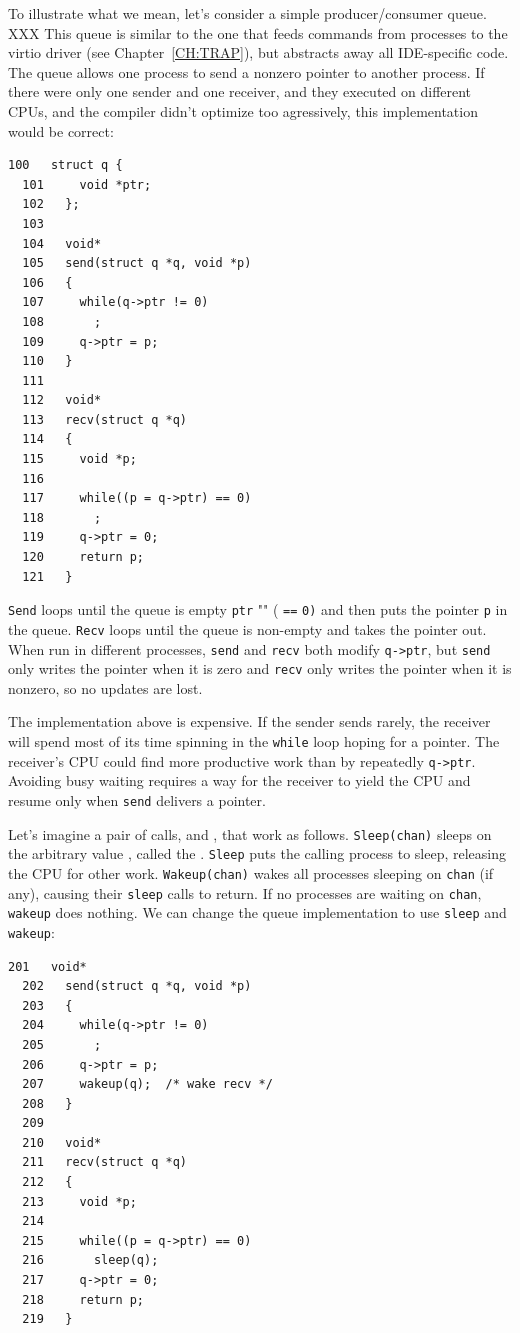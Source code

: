 To illustrate what we mean, let's consider a
simple producer/consumer queue.
XXX This queue is similar to the one that feeds commands from processes
to the virtio driver
(see Chapter~\ref{CH:TRAP}), but abstracts away all
IDE-specific code.
The queue allows one process to send a nonzero pointer
to another process.
If there were only one sender and one receiver,
and they executed on different CPUs,
and the compiler didn't optimize too agressively,
this implementation would be correct:
\begin{lstlisting}[]
  100	struct q {
  101	  void *ptr;
  102	};
  103	
  104	void*
  105	send(struct q *q, void *p)
  106	{
  107	  while(q->ptr != 0)
  108	    ;
  109	  q->ptr = p;
  110	}
  111	
  112	void*
  113	recv(struct q *q)
  114	{
  115	  void *p;
  116	
  117	  while((p = q->ptr) == 0)
  118	    ;
  119	  q->ptr = 0;
  120	  return p;
  121	}
\end{lstlisting}
\lstinline{Send}
loops until the queue is empty
\lstinline{ptr} "" (
\lstinline{==}
\lstinline{0)}
and then puts the pointer
\lstinline{p}
in the queue.
\lstinline{Recv}
loops until the queue is non-empty
and takes the pointer out.
When run in different processes,
\lstinline{send}
and
\lstinline{recv}
both modify
\lstinline{q->ptr},
but
\lstinline{send}
only writes the pointer when it is zero
and
\lstinline{recv}
only writes the pointer when it is nonzero,
so no updates are lost.

The implementation above 
is expensive.  If the sender sends
rarely, the receiver will spend most
of its time spinning in the 
\lstinline{while}
loop hoping for a pointer.
The receiver's CPU could find more productive work than
by repeatedly 
\lstinline{q->ptr}.
Avoiding busy waiting requires
a way for the receiver to yield the CPU
and resume only when 
\lstinline{send}
delivers a pointer.

Let's imagine a pair of calls, 
and
,
that work as follows.
\lstinline{Sleep(chan)}
sleeps on the arbitrary value
,
called the 
.
\lstinline{Sleep}
puts the calling process to sleep, releasing the CPU
for other work.
\lstinline{Wakeup(chan)}
wakes all processes sleeping on
\lstinline{chan}
(if any), causing their
\lstinline{sleep}
calls to return.
If no processes are waiting on
\lstinline{chan},
\lstinline{wakeup}
does nothing.
We can change the queue implementation to use
\lstinline{sleep}
and
\lstinline{wakeup}:
\begin{lstlisting}[]
  201	void*
  202	send(struct q *q, void *p)
  203	{
  204	  while(q->ptr != 0)
  205	    ;
  206	  q->ptr = p;
  207	  wakeup(q);  /* wake recv */
  208	}
  209	
  210	void*
  211	recv(struct q *q)
  212	{
  213	  void *p;
  214	
  215	  while((p = q->ptr) == 0)
  216	    sleep(q);
  217	  q->ptr = 0;
  218	  return p;
  219	}
\end{lstlisting}

